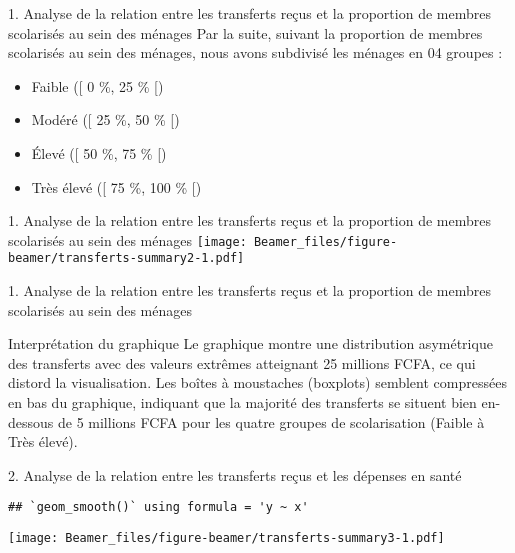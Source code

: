 \documentclass[
  11pt,
  ignorenonframetext,
]{beamer}
\begin{document}
\begin{frame}{1. Analyse de la relation entre les transferts reçus et la
proportion de membres scolarisés au sein des ménages}
\label{analyse-de-la-relation-entre-les-transferts-reuxe7us-et-la-proportion-de-membres-scolarisuxe9s-au-sein-des-muxe9nages-2}
Par la suite, suivant la proportion de membres scolarisés au sein des
ménages, nous avons subdivisé les ménages en 04 groupes :

\begin{itemize}
\item
  Faible ({[} 0 \%, 25 \% {[})
\item
  Modéré ({[} 25 \%, 50 \% {[})
\item
  Élevé ({[} 50 \%, 75 \% {[})
\item
  Très élevé ({[} 75 \%, 100 \% {[})
\end{itemize}
\end{frame}

\begin{frame}{1. Analyse de la relation entre les transferts reçus et la
proportion de membres scolarisés au sein des ménages}
\label{analyse-de-la-relation-entre-les-transferts-reuxe7us-et-la-proportion-de-membres-scolarisuxe9s-au-sein-des-muxe9nages-3}
\texttt{[image: Beamer\_files/figure-beamer/transferts-summary2-1.pdf]}
\end{frame}

\begin{frame}{1. Analyse de la relation entre les transferts reçus et la
proportion de membres scolarisés au sein des ménages}
\label{analyse-de-la-relation-entre-les-transferts-reuxe7us-et-la-proportion-de-membres-scolarisuxe9s-au-sein-des-muxe9nages-4}
\begin{block}{Interprétation du graphique}
\label{interpruxe9tation-du-graphique}
Le graphique montre une distribution asymétrique des transferts avec des
valeurs extrêmes atteignant 25 millions FCFA, ce qui distord la
visualisation. Les boîtes à moustaches (boxplots) semblent compressées
en bas du graphique, indiquant que la majorité des transferts se situent
bien en-dessous de 5 millions FCFA pour les quatre groupes de
scolarisation (Faible à Très élevé).
\end{block}
\end{frame}

\begin{frame}[fragile]{2. Analyse de la relation entre les transferts
reçus et les dépenses en santé}
\label{analyse-de-la-relation-entre-les-transferts-reuxe7us-et-les-duxe9penses-en-santuxe9}
\begin{verbatim}
## `geom_smooth()` using formula = 'y ~ x'
\end{verbatim}

\texttt{[image: Beamer\_files/figure-beamer/transferts-summary3-1.pdf]}
\end{frame}
\end{document}
